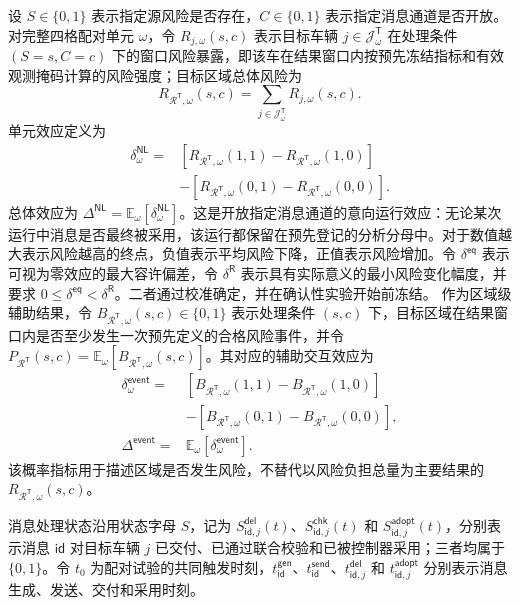 \documentclass[10pt,a4paper,twocolumn]{article}
\newcommand{\revGreen}[1]{#1}
\newcommand{\revBlue}[1]{#1}
\begin{document}
\revGreen{设 $S\in\{0,1\}$ 表示指定源风险是否存在，$C\in\{0,1\}$ 表示指定消息通道是否开放。对完整四格配对单元 $\omega$，令 $R_{j,\omega}(s,c)$ 表示目标车辆 $j\in\mathcal J^{\mathsf T}_{\omega}$ 在处理条件 $(S=s,C=c)$ 下的窗口风险暴露，即该车在结果窗口内按预先冻结指标和有效观测掩码计算的风险强度；目标区域总体风险为}
\begin{equation}
R_{\mathcal R^{\mathsf T},\omega}(s,c)=\sum_{j\in\mathcal J^{\mathsf T}_{\omega}}R_{j,\omega}(s,c).
\end{equation}
单元效应定义为
\begin{equation}
\begin{aligned}
\delta_{\omega}^{\mathsf{NL}}={}&[R_{\mathcal R^{\mathsf T},\omega}(1,1)-R_{\mathcal R^{\mathsf T},\omega}(1,0)]\\
&-[R_{\mathcal R^{\mathsf T},\omega}(0,1)-R_{\mathcal R^{\mathsf T},\omega}(0,0)].
\end{aligned}
\end{equation}
总体效应为 $\Delta^{\mathsf{NL}}=\mathbb E_\omega[\delta_\omega^{\mathsf{NL}}]$。这是开放指定消息通道的意向运行效应：无论某次运行中消息是否最终被采用，该运行都保留在预先登记的分析分母中。对于数值越大表示风险越高的终点，负值表示平均风险下降，正值表示风险增加。令 $\delta^{\mathsf{eq}}$ 表示可视为零效应的最大容许偏差，令 $\delta^{\mathsf R}$ 表示具有实际意义的最小风险变化幅度，并要求 $0\leq\delta^{\mathsf{eq}}<\delta^{\mathsf R}$。二者通过校准确定，并在确认性实验开始前冻结。
作为区域级辅助结果，令 $B_{\mathcal R^{\mathsf T},\omega}(s,c)\in\{0,1\}$ 表示处理条件 $(s,c)$ 下，目标区域在结果窗口内是否至少发生一次预先定义的合格风险事件，并令 $P_{\mathcal R^{\mathsf T}}(s,c)=\mathbb E_\omega[B_{\mathcal R^{\mathsf T},\omega}(s,c)]$。其对应的辅助交互效应为
\begin{equation}
\begin{aligned}
\delta_{\omega}^{\mathsf{event}}={}&[B_{\mathcal R^{\mathsf T},\omega}(1,1)-B_{\mathcal R^{\mathsf T},\omega}(1,0)]\\
&-[B_{\mathcal R^{\mathsf T},\omega}(0,1)-B_{\mathcal R^{\mathsf T},\omega}(0,0)],\\
\Delta^{\mathsf{event}}={}&\mathbb E_\omega[\delta_{\omega}^{\mathsf{event}}].
\end{aligned}
\end{equation}
该概率指标用于描述区域是否发生风险，不替代以风险负担总量为主要结果的 $R_{\mathcal R^{\mathsf T},\omega}(s,c)$。

\revBlue{消息处理状态沿用状态字母 $S$，记为 $S_{\mathsf{id},j}^{\mathsf{del}}(t)$、$S_{\mathsf{id},j}^{\mathsf{chk}}(t)$ 和 $S_{\mathsf{id},j}^{\mathsf{adopt}}(t)$，分别表示消息 $\mathsf{id}$ 对目标车辆 $j$ 已交付、已通过联合校验和已被控制器采用；三者均属于 $\{0,1\}$。令 $t_0$ 为配对试验的共同触发时刻，$t_{\mathsf{id}}^{\mathsf{gen}}$、$t_{\mathsf{id}}^{\mathsf{send}}$、$t_{\mathsf{id},j}^{\mathsf{del}}$ 和 $t_{\mathsf{id},j}^{\mathsf{adopt}}$ 分别表示消息生成、发送、交付和采用时刻。}
\end{document}
